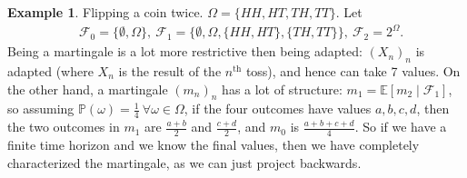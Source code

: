 \documentclass{article}
\theoremstyle{definition}
\newtheorem{example}{Example}[section]
\begin{document}
\begin{example}
    Flipping a coin twice. $\Omega = \{HH,HT,TH,TT\}$. Let 
    \begin{align*}
        &\mathcal{F}_0 = \{\emptyset, \Omega\}, ~\mathcal{F}_1 = \{\emptyset, \Omega, \{HH,HT\}, \{TH,TT\}\},~ \mathcal{F}_2 = 2^{\Omega}.
    \end{align*}
    Being a martingale is a lot more restrictive then being adapted: $(X_n)_n$ is adapted (where $X_n$ is the result of the $n^{\text{th}}$ toss), and hence can take 7 values. On the other hand, a martingale $(m_n)_n$ has a lot of structure: $m_1 = \mathbb{E}[m_2 \mid \mathcal{F}_1]$, so assuming $\mathbb{P}(\omega)=\frac{1}{4} ~\forall \omega \in \Omega$, if the four outcomes have values $a,b,c,d$, then the two outcomes in $m_1$ are $\frac{a+b}{2}$ and $\frac{c+d}{2}$, and $m_0$ is $\frac{a+b+c+d}{4}$. So if we have a finite time horizon and we know the final values, then we have completely characterized the martingale, as we can just project backwards.
\end{example}
\end{document}
